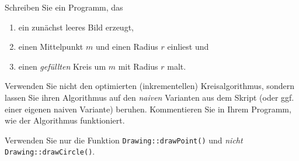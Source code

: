 %
Schreiben Sie ein Programm, das
%
\begin{enumerate}
  \item ein zunächst leeres Bild erzeugt,
  \item einen Mittelpunkt $m$ und einen Radius $r$ einliest und
  \item einen \emph{gefüllten} Kreis um $m$ mit Radius $r$ malt.
\end{enumerate}
%
Verwenden Sie nicht den optimierten (inkrementellen) Kreisalgorithmus,
sondern lassen Sie ihren Algorithmus auf den \emph{naiven} Varianten aus
dem Skript (oder ggf. einer eigenen naiven Variante) beruhen.
Kommentieren Sie in Ihrem Programm, wie der Algorithmus funktioniert.

Verwenden Sie nur die Funktion
\texttt{Drawing::drawPoint()} und \emph{nicht}
\texttt{Drawing::drawCircle()}.
